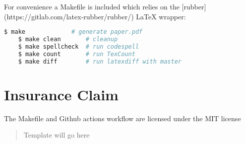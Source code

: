 \documentclass[]{article}
\begin{document}
For convenience a Makefile is included which relies on the [rubber](https://gitlab.com/latex-rubber/rubber/) LaTeX wrapper:


\begin{center}
	\begin{lstlisting}[language=Bash,morekeywords={make}]
	$ make             # generate paper.pdf
	$ make clean       # cleanup
	$ make spellcheck  # run codespell
	$ make count       # run TexCount
	$ make diff        # run latexdiff with master
	\end{lstlisting}
\end{center}


\section{Insurance Claim}

The Makefile and Github actions workflow are licensed under the MIT license

\begin{quote}
	Template will go here
\end{quote}
\end{document}

